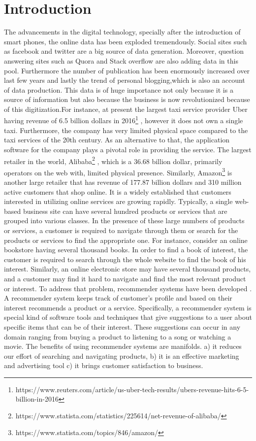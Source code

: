 \section{Introduction}
The advancements in the digital technology, specially after the introduction of smart phones, the online data has been exploded tremendously. Social sites such as facebook and twitter are a big source of data generation. Moreover, question answering sites such as Quora and Stack overflow are also adding data in this pool. Furthermore the number of publication has been enormously increased over last few years and lastly the trend of personal blogging,which is also an account of data production. This data is of huge importance not only because it is a source of information but also because the business is now revolutionized because of this digitization.For instance, at present the largest taxi service provider Uber having revenue of 6.5 billion dollars in 2016\footnote{https://www.reuters.com/article/us-uber-tech-results/ubers-revenue-hits-6-5-billion-in-2016} , however it does not own a single taxi. Furthermore, the company has very limited physical space compared to the taxi services of the 20th century. As an alternative to that, the application software for the company plays a pivotal role in providing the service.  The largest retailer   in the world, Alibaba\footnote{https://www.statista.com/statistics/225614/net-revenue-of-alibaba/} , which is a 36.68 billion dollar, primarily operators on the web with, limited physical presence. Similarly, Amazon\footnote{https://www.statista.com/topics/846/amazon/}  is another large retailer that has revenue of 177.87 billion dollars and 310 million active customers that shop online. It is a widely established that customers interested in utilizing online services are growing rapidly.
\newline
Typically, a single web-based business site can have several hundred products or services that are grouped into various classes. In the presence of these large numbers of products or services, a customer is required to navigate through them or search for the products or services to find the appropriate one. For instance, consider an online bookstore having several thousand books. In order to find a book of interest, the customer is required to search through the whole website to find the book of his interest. Similarly, an online electronic store may have several thousand products, and a customer may find it hard to navigate and find the most relevant product or interest. To address that problem, recommender systems have been developed \cite{RSSurvey}. A recommender system keeps track of customer’s profile and based on their interest recommends a product or a service\cite{SemanticRelationForContentBased}. Specifically, a recommender system is special kind of software tools and techniques that give suggestions to a user about specific items that can be of their interest. These suggestions can occur in any domain ranging from buying a product to listening to a song or watching a movie. The benefits of using recommender systems are manifolds. a) it reduces our effort of searching and navigating products, b) it is an effective marketing and advertising tool c) it brings customer satisfaction to business\cite{handbook}. 
